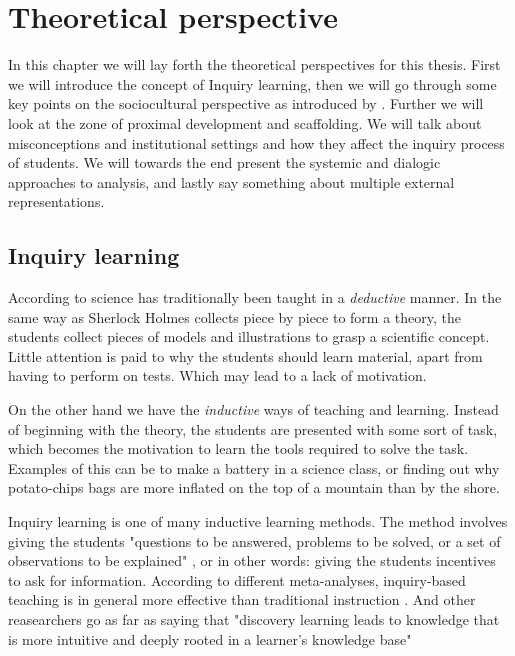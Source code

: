 \chapter{Theoretical perspective}

In this chapter we will lay forth the theoretical perspectives for this thesis. First we will introduce the concept of Inquiry learning, then we will go through some key points on the sociocultural perspective as introduced by \citeauthor*{vygotskiui1978mind}. Further we will look at the zone of proximal development and scaffolding. We will talk about misconceptions and institutional settings and how they affect the inquiry process of students. We will towards the end present the systemic and dialogic approaches to analysis, and lastly say something about multiple external representations.

\section{Inquiry learning}
According to \citet{prince2006inductive} science has traditionally been taught in a \textit{deductive} manner. In the same way as Sherlock Holmes collects piece by piece to form a theory, the students collect pieces of models and illustrations to grasp a scientific concept. Little attention is paid to why the students should learn material, apart from having to perform on tests. Which may lead to a lack of motivation.

On the other hand we have the \textit{inductive} ways of teaching and learning. Instead of beginning with the theory, the students are presented with some sort of task, which becomes the motivation to learn the tools required to solve the task. Examples of this can be to make a battery in a science class, or finding out why potato-chips bags are more inflated on the top of a mountain than by the shore.

Inquiry learning is one of many inductive learning methods. The method involves giving the students "questions to be answered, problems to be solved, or a set of observations to be explained" \citep{prince2006inductive}, or in other words: giving the students incentives to ask for information. According to different meta-analyses, inquiry-based teaching is in general more effective than traditional instruction \citetext{Smith, 1996; Haury, 1993, referenced in \citealp{prince2006inductive}}. And other reasearchers go as far as saying that "discovery learning leads to knowledge that is more intuitive and deeply rooted in a learner's knowledge base" \citetext{Berry \& Broadbent, 1984; Laurillard, 1992; Lindstrøm, Marton, Ottosson \& Laurillard, 1993; Swaak \& De Jong, 1996, referenced in \citealp{de1998scientific}}

